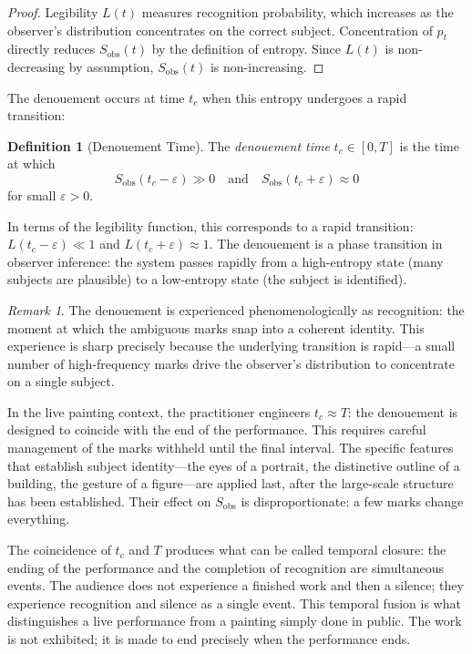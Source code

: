 \documentclass[11pt, twoside]{article}
\theoremstyle{plain}
\theoremstyle{definition}
\newtheorem{definition}[theorem]{Definition}
\theoremstyle{remark}
\newtheorem{remark}[theorem]{Remark}
\begin{document}
\begin{proof}
Legibility $L(t)$ measures recognition probability, which increases as the observer's distribution concentrates on the correct subject. Concentration of $p_t$ directly reduces $S_{\text{obs}}(t)$ by the definition of entropy. Since $L(t)$ is non-decreasing by assumption, $S_{\text{obs}}(t)$ is non-increasing.
\end{proof}

The denouement occurs at time $t_c$ when this entropy undergoes a rapid transition:

\begin{definition}[Denouement Time]
The \emph{denouement time} $t_c \in [0, T]$ is the time at which
\[
S_{\text{obs}}(t_c - \varepsilon) \gg 0 \quad \text{and} \quad S_{\text{obs}}(t_c + \varepsilon) \approx 0
\]
for small $\varepsilon > 0$.
\end{definition}

In terms of the legibility function, this corresponds to a rapid transition: $L(t_c - \varepsilon) \ll 1$ and $L(t_c + \varepsilon) \approx 1$. The denouement is a phase transition in observer inference: the system passes rapidly from a high-entropy state (many subjects are plausible) to a low-entropy state (the subject is identified).

\begin{remark}
The denouement is experienced phenomenologically as recognition: the moment at which the ambiguous marks snap into a coherent identity. This experience is sharp precisely because the underlying transition is rapid---a small number of high-frequency marks drive the observer's distribution to concentrate on a single subject.
\end{remark}

In the live painting context, the practitioner engineers $t_c \approx T$: the denouement is designed to coincide with the end of the performance. This requires careful management of the marks withheld until the final interval. The specific features that establish subject identity---the eyes of a portrait, the distinctive outline of a building, the gesture of a figure---are applied last, after the large-scale structure has been established. Their effect on $S_{\text{obs}}$ is disproportionate: a few marks change everything.

The coincidence of $t_c$ and $T$ produces what can be called temporal closure: the ending of the performance and the completion of recognition are simultaneous events. The audience does not experience a finished work and then a silence; they experience recognition and silence as a single event. This temporal fusion is what distinguishes a live performance from a painting simply done in public. The work is not exhibited; it is made to end precisely when the performance ends.
\end{document}
